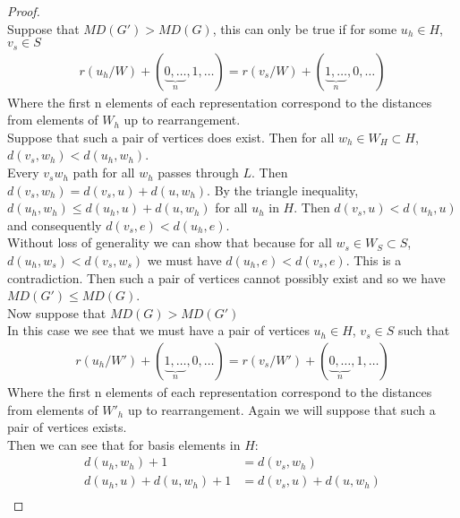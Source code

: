\documentclass[11pt]{amsart}
\theoremstyle{plain}  %
\theoremstyle{definition}
\theoremstyle{remark}
\numberwithin{equation}{thm}
\begin{document}
\begin{proof}$\ $\\
 Suppose that $MD(G') > MD(G)$, this can only be true if for some $u_h \in H$, $v_s\in S$
\begin{align*}
 r(u_h/W) + (\underbrace{0,\dots}_{n},1,\dots) = r(v_s/W) + (\underbrace{1,\dots}_{n},0,\dots)
\end{align*}
Where the first n elements of each representation correspond to the distances from elements of $W_h$ up to rearrangement.\\
Suppose that such a pair of vertices does exist. Then for all $w_h\in W_H \subset H$,\\ $d(v_s, w_h)<d(u_h, w_h)$.\\
Every $v_sw_h$ path for all $w_h$ passes through $L$. Then $d(v_s, w_h)=d(v_s, u)+ d(u, w_h)$. 
By the triangle inequality, $d(u_h, w_h) \leq d(u_h, u) + d(u, w_h)$ for all $u_h$ in $H$.
Then $d(v_s, u)<d(u_h,u)$ and consequently $d(v_s, e)<d(u_h, e)$.\\
Without loss of generality we can show that because for all $w_s\in W_S\subset S$, $d(u_h, w_s)<d(v_s, w_s)$ we must have
$d(u_h, e)<d(v_s,e)$. This is a contradiction. Then such a pair of vertices cannot possibly exist and so we have $MD(G') \leq MD(G)$.\\
Now suppose that $MD(G) > MD(G')$\\
In this case we see that we must have a pair of vertices $u_h \in H$, $v_s\in S$ such that
\begin{align*}
 r(u_h/W') + (\underbrace{1,\dots}_{n},0,\dots) = r(v_s/W') + (\underbrace{0,\dots}_{n},1,\dots)
\end{align*}
Where the first n elements of each representation correspond to the distances from elements of $W'_h$ up to rearrangement. 
Again we will suppose that such a pair of vertices exists.\\ 
Then we can see that for basis elements in $H$:
\begin{align*}
d(u_h, w_h) + 1 &= d(v_s,w_h)\\
d(u_h, u) + d(u, w_h) + 1 &= d(v_s, u) + d(u, w_h)\\

\end{align*}
\end{proof}
\end{document}
